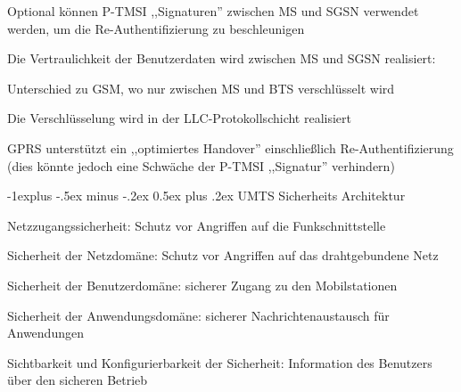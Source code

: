 \documentclass[a4paper]{article}
\makeatletter
\renewcommand{\subsection}{\@startsection{subsection}{2}{0mm}%
 {-1explus -.5ex minus -.2ex}%
 {0.5ex plus .2ex}%
 {\normalfont\normalsize\bfseries}}
\makeatother
\begin{document}
\begin{multicols}{3}
\begin{itemize*}
\begin{itemize*}
\begin{itemize*}
                        \item Optional können P-TMSI ,,Signaturen'' zwischen MS und SGSN verwendet werden, um die Re-Authentifizierung zu beschleunigen
                  \end{itemize*}
                  \item Die Vertraulichkeit der Benutzerdaten wird zwischen MS und SGSN realisiert:
                  \begin{itemize*}
                        \item Unterschied zu GSM, wo nur zwischen MS und BTS verschlüsselt wird
                        \item Die Verschlüsselung wird in der LLC-Protokollschicht realisiert
                  \end{itemize*}
            \end{itemize*}
      \end{itemize*}

      \begin{itemize*}
            \item GPRS unterstützt ein ,,optimiertes Handover'' einschließlich Re-Authentifizierung (dies könnte jedoch eine Schwäche der P-TMSI ,,Signatur'' verhindern)
      \end{itemize*}

      \subsection{UMTS Sicherheits Architektur}
      \begin{enumerate*}
            \item Netzzugangssicherheit: Schutz vor Angriffen auf die Funkschnittstelle
            \item Sicherheit der Netzdomäne: Schutz vor Angriffen auf das drahtgebundene Netz
            \item Sicherheit der Benutzerdomäne: sicherer Zugang zu den Mobilstationen
            \item Sicherheit der Anwendungsdomäne: sicherer Nachrichtenaustausch für Anwendungen
            \item Sichtbarkeit und Konfigurierbarkeit der Sicherheit: Information des Benutzers über den sicheren Betrieb
      \end{enumerate*}


\end{multicols}
\end{document}
